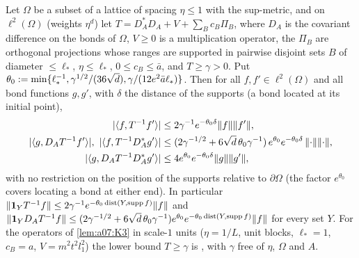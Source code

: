\begin{lemma}\label{lem:a07:CT}
Let $\Omega$ be a subset of a lattice of spacing $\eta\le1$ with the sup-metric, and on $\ell^2(\Omega)$ (weights $\eta^d$) let $T=D_A^*D_A+V+\sum_Bc_B\Pi_B$, where $D_A$ is the covariant difference on the bonds of $\Omega$, $V\ge0$ is a multiplication operator, the $\Pi_B$ are orthogonal projections whose ranges are supported in pairwise disjoint sets $B$ of diameter $\le\ell_*$, $\eta\le\ell_*$, $0\le c_B\le\bar a$, and $T\ge\gamma>0$. Put $\theta_0:=\min\{\ell_*^{-1},\gamma^{1/2}/(36\sqrt d),\gamma/(12e^2\bar a\ell_*)\}$. Then for all $f,f'\in\ell^2(\Omega)$ and all bond functions $g,g'$, with $\delta$ the distance of the supports (a bond located at its initial point),
\begin{align*}
|\langle f,T^{-1}f'\rangle|&\le2\gamma^{-1}e^{-\theta_0\delta}\lVert f\rVert\lVert f'\rVert,\\
|\langle g,D_AT^{-1}f'\rangle|,\ |\langle f,T^{-1}D_A^*g'\rangle|&\le(2\gamma^{-1/2}+6\sqrt d\,\theta_0\gamma^{-1})\,e^{\theta_0}e^{-\theta_0\delta}\,\lVert \cdot\rVert\lVert \cdot\rVert,\\
|\langle g,D_AT^{-1}D_A^*g'\rangle|&\le4e^{\theta_0}e^{-\theta_0\delta}\lVert g\rVert\lVert g'\rVert,
\end{align*}
with no restriction on the position of the supports relative to $\partial\Omega$ (the factor $e^{\theta_0}$ covers locating a bond at either end). In particular $\lVert \mathbf 1_YT^{-1}f\rVert\le2\gamma^{-1}e^{-\theta_0\operatorname{dist}(Y,\operatorname{supp} f)}\lVert f\rVert$ and $\lVert \mathbf 1_YD_AT^{-1}f\rVert\le(2\gamma^{-1/2}+6\sqrt d\,\theta_0\gamma^{-1})e^{\theta_0}e^{-\theta_0\operatorname{dist}(Y,\operatorname{supp} f)}\lVert f\rVert$ for every set $Y$. For the operators of \cref{lem:a07:K3} in scale-$1$ units ($\eta=1/L$, unit blocks, $\ell_*=1$, $c_B=a$, $V=m^2t^2l_1^2$) the lower bound $T\ge\gamma$ is \cite[(1.8)]{Ba4}, with $\gamma$ free of $\eta$, $\Omega$ and $A$.
\end{lemma}
